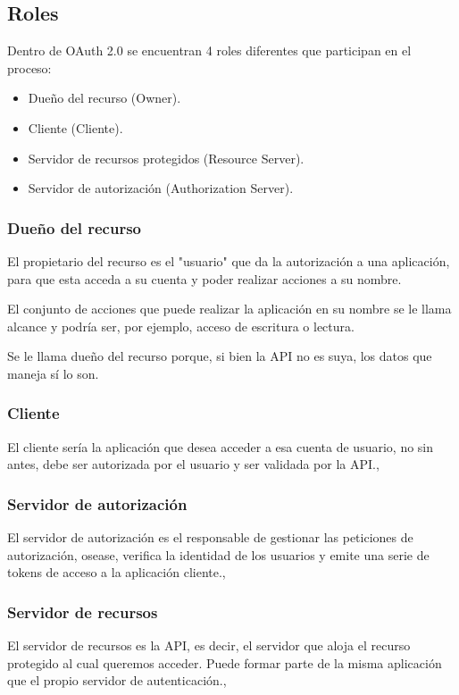 \subsection{Roles}
Dentro de OAuth 2.0 se encuentran 4 roles diferentes que participan en el proceso:
\begin{itemize}
    \item Dueño del recurso (Owner).
    \item Cliente (Cliente).
    \item Servidor de recursos protegidos (Resource Server).
    \item Servidor de autorización (Authorization Server).
\end{itemize}

\subsubsection{Dueño del recurso}
El propietario del recurso es el "usuario" que da la autorización a una aplicación, para que esta acceda a su cuenta y poder realizar acciones a su nombre. \cite{Magana2020}

El conjunto de acciones que puede realizar la aplicación en su nombre se le llama alcance y podría ser, por ejemplo, acceso de escritura o lectura.

Se le llama dueño del recurso porque, si bien la API no es suya, los datos que maneja sí lo son.

\subsubsection{Cliente}
El cliente sería la aplicación que desea acceder a esa cuenta de usuario, no sin antes, debe ser autorizada por el usuario y ser validada por la API.\cite{Anicas2018},

\subsubsection{Servidor de autorización}
El servidor de autorización es el responsable de gestionar las peticiones de autorización, osease, verifica la identidad de los usuarios y emite una serie de tokens de acceso a la aplicación cliente.\cite{Anicas2018},

\subsubsection{Servidor de recursos}
El servidor de recursos es la API, es decir, el servidor que aloja el recurso protegido al cual queremos acceder. Puede formar parte de la misma aplicación que el propio servidor de autenticación.\cite{Anicas2018},

